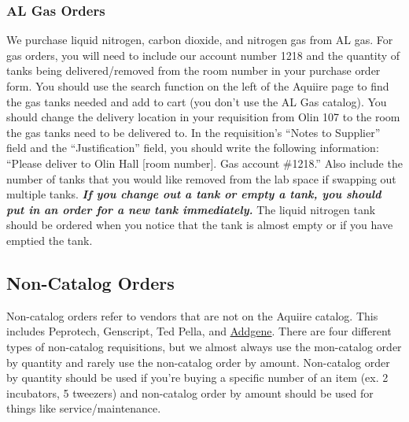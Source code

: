 \documentclass[
]{book}
\begin{document}
\hypertarget{al-gas-orders}{%
\subsubsection{AL Gas Orders}\label{al-gas-orders}}

We purchase liquid nitrogen, carbon dioxide, and nitrogen gas from AL gas. For gas orders, you will need to include our account number 1218 and the quantity of tanks being delivered/removed from the room number in your purchase order form. You should use the search function on the left of the Aquiire page to find the gas tanks needed and add to cart (you don't use the AL Gas catalog). You should change the delivery location in your requisition from Olin 107 to the room the gas tanks need to be delivered to. In the requisition's ``Notes to Supplier'' field and the ``Justification'' field, you should write the following information: ``Please deliver to Olin Hall {[}room number{]}. Gas account \#1218.'' Also include the number of tanks that you would like removed from the lab space if swapping out multiple tanks. \textbf{\emph{If you change out a tank or empty a tank, you should put in an order for a new tank immediately.}} The liquid nitrogen tank should be ordered when you notice that the tank is almost empty or if you have emptied the tank.

\hypertarget{noncatalog}{%
\subsection{Non-Catalog Orders}\label{noncatalog}}

Non-catalog orders refer to vendors that are not on the Aquiire catalog. This includes Peprotech, Genscript, Ted Pella, and \protect\hyperlink{addgene}{Addgene}. There are four different types of non-catalog requisitions, but we almost always use the mon-catalog order by quantity and rarely use the non-catalog order by amount. Non-catalog order by quantity should be used if you're buying a specific number of an item (ex. 2 incubators, 5 tweezers) and non-catalog order by amount should be used for things like service/maintenance.
\end{document}
